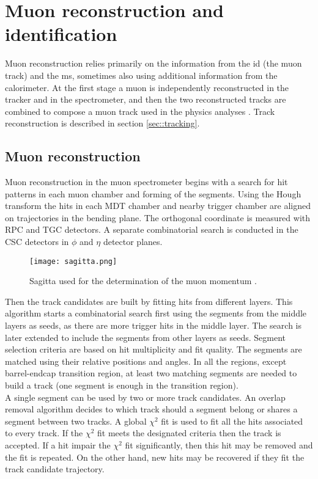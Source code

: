     \section{Muon reconstruction and identification}
    Muon reconstruction relies primarily on the information from the \gls{id} (the muon track) and the \gls{ms}, sometimes also using additional information from the calorimeter. At the first stage a muon is independently reconstructed in the tracker and in the spectrometer, and then the two reconstructed tracks are combined to compose a muon track used in the physics analyses \cite{muons_reco1}. Track reconstruction is described in section \ref{sec::tracking}. 
    \subsection{Muon reconstruction}
    Muon reconstruction in the muon spectrometer begins with a search for hit patterns in each muon chamber and forming of the segments. Using the Hough transform \cite{ILLINGWORTH198887} the hits in each MDT chamber and nearby trigger chamber are aligned on trajectories in the bending plane. The orthogonal coordinate is measured with RPC and TGC detectors. A separate combinatorial search is conducted in the CSC detectors in $\phi$ and $\eta$ detector planes.\\
     \begin{figure}[htbp]
    	\centering
    	\texttt{[image: sagitta.png]}
    	\caption[sagitta]{Sagitta used for the determination of the muon momentum \cite{Kaiser:2010zea}.}
    	\label{fig::sagitta}
    \end{figure}
    Then the track candidates are built by fitting hits from different layers. This algorithm starts a combinatorial search first using the segments from the middle layers as seeds, as there are more trigger hits in the middle layer. The search is later extended to include the segments from other layers as seeds. Segment selection criteria are based on hit multiplicity and fit quality. The segments are matched using their relative positions and angles. In all the regions, except barrel-endcap transition region, at least two matching segments are needed to build a track (one segment is enough in the transition region).\\
    A single segment can be used by two or more track candidates. An overlap removal algorithm decides to which track should a segment belong or shares a segment between two tracks. A global $\chi^2$ fit is used to fit all the hits associated to every track. If the $\chi^2$ fit meets the designated criteria then the track is accepted. If a hit impair the $\chi^2$ fit significantly, then this hit may be removed and the fit is repeated. On the other hand, new hits may be recovered if they fit the track candidate trajectory. \\
